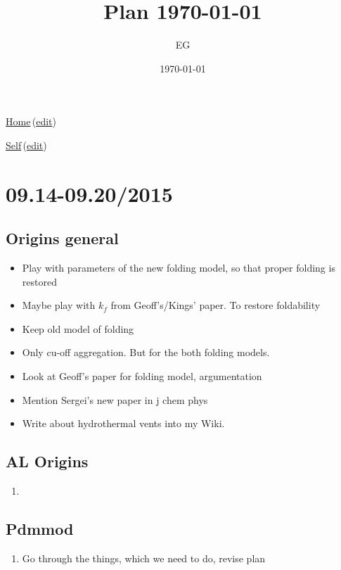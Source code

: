 \documentclass[12pt]{paper}
\title{Plan \today}
\author{EG}
\date{\today}
\newcommand{\wikilink}[2] { \href{#1.pdf}{#2}\,(\href{#1.tex}{edit})}
\begin{document}
 \maketitle
\wikilink{home}{Home}

\wikilink{plan}{Self}

\tableofcontents


\section{09.14-09.20/2015}
\subsection*{Origins general}
\begin{itemize}
 \item  Play with parameters of the new folding model, so that proper folding is restored
\item  Maybe play with $k_f$ from Geoff's/Kings' paper. To restore foldability
\item Keep old model of folding
\item Only cu-off aggregation. But for the both folding models.
\item Look at Geoff's paper for folding model, argumentation
 \item Mention Sergei's new paper in  j chem phys
 \item Write about hydrothermal vents into my Wiki.
\end{itemize}



\subsection*{AL Origins}
\begin{enumerate}
 \item 
\end{enumerate}

\subsection*{Pdmmod}
\begin{enumerate}
 \item Go through the things, which we need to do, revise plan
\end{enumerate}
\end{document}

